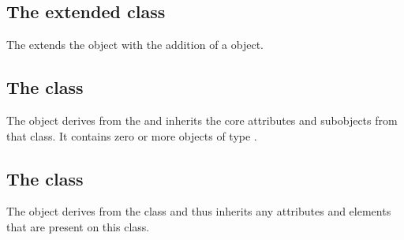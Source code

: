 \subsection{The extended  class}
\label{extended-compartment-class}




The \FooPackage extends the  object with the addition
of
a \ListOfPears object.

\subsection{The  class}
\label{listofpears-class}


The \ListOfPears object derives from the  and inherits the
core attributes and subobjects from that class. It contains zero or more
objects of type \Pear.

\subsection{The  class}
\label{pear-class}




The \Pear object derives from the \SBase class and thus inherits any
attributes and elements that are present on this class.
